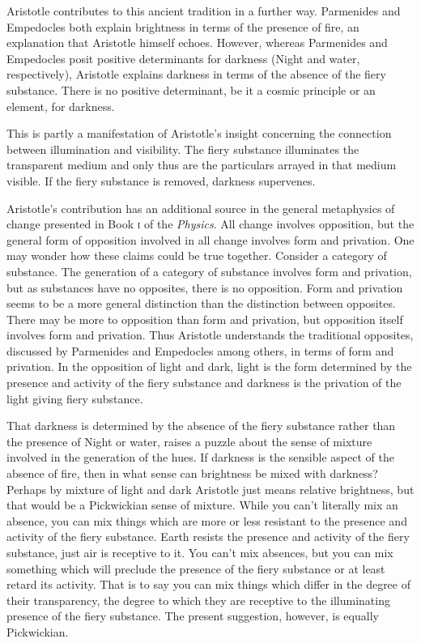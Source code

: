 Aristotle contributes to this ancient tradition in a further way. Parmenides and Empedocles both explain brightness in terms of the presence of fire, an explanation that Aristotle himself echoes. However, whereas Parmenides and Empedocles posit positive determinants for darkness (Night and water, respectively), Aristotle explains darkness in terms of the absence of the fiery substance. There is no positive determinant, be it a cosmic principle or an element, for darkness. 

This is partly a manifestation of Aristotle's insight concerning the connection between illumination and visibility. The fiery substance illuminates the transparent medium and only thus are the particulars arrayed in that medium visible. If the fiery substance is removed, darkness supervenes. 

Aristotle's contribution has an additional source in the general metaphysics of change presented in Book \textsc{i} of the \emph{Physics}. All change involves opposition, but the general form of opposition involved in all change involves form and privation. One may wonder how these claims could be true together. Consider a category of substance. The generation of a category of substance involves form and privation, but as substances have no opposites, there is no opposition. Form and privation seems to be a more general distinction than the distinction between opposites. There may be more to opposition than form and privation, but opposition itself involves form and privation. Thus Aristotle understands the traditional opposites, discussed by Parmenides and Empedocles among others, in terms of form and privation. In the opposition of light and dark, light is the form determined by the presence and activity of the fiery substance and darkness is the privation of the light giving fiery substance. 

That darkness is determined by the absence of the fiery substance rather than the presence of Night or water, raises a puzzle about the sense of mixture involved in the generation of the hues. If darkness is the sensible aspect of the absence of fire, then in what sense can brightness be mixed with darkness? Perhaps by mixture of light and dark Aristotle just means relative brightness, but that would be a Pickwickian sense of mixture. While you can't literally mix an absence, you can mix things which are more or less resistant to the presence and activity of the fiery substance. Earth resists the presence and activity of the fiery substance, just air is receptive to it. You can't mix absences, but you can mix something which will preclude the presence of the fiery substance or at least retard its activity. That is to say you can mix things which differ in the degree of their transparency, the degree to which they are receptive to the illuminating presence of the fiery substance. The present suggestion, however, is equally Pickwickian. 

